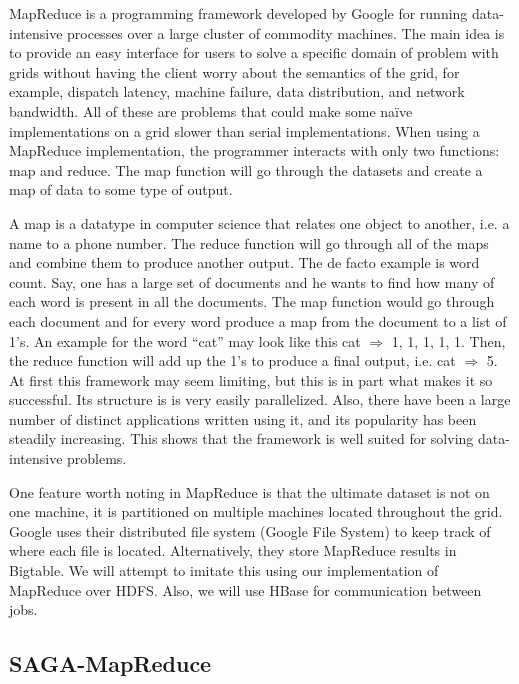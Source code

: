 \documentclass[conference,final]{IEEEtran}
\begin{document}

MapReduce is a programming framework developed by Google for running
data-intensive processes over a large cluster of commodity machines.
The main idea is to provide an easy interface for users to solve a
specific domain of problem with grids without having the client worry 
about the semantics of the grid, for example, dispatch latency, machine
failure, data distribution, and network bandwidth.  All of these are
problems that could make some naïve implementations on a grid slower
than serial implementations.  When using a MapReduce implementation,
the programmer interacts with only two functions: map and reduce.  
The map function will go through the datasets and create a map of data
to some type of output.  

A map is a datatype in computer science that relates one object to
another, i.e. a name to a phone number.  The reduce function will go
through all of the maps and combine them to produce another output.
The de facto example is word count.  Say, one has a large set of
documents and he wants to find how many of each word is present in all
the documents.  The map function would go through each document and
for every word produce a map from the document to a list of 1’s.  An
example for the word “cat” may look like this cat $\Rightarrow$ 1, 1,
1, 1, 1.  Then, the reduce function will add up the 1’s to produce a
final output, i.e. cat $\Rightarrow$ 5.  At first this framework may
seem limiting, but this is in part what makes it so successful.  Its
structure is is very easily parallelized.  Also, there have been a
large number of distinct applications written using it, and its
popularity has been steadily increasing.  This shows that the
framework is well suited for solving data-intensive problems.

One feature worth noting in MapReduce is that the ultimate dataset is
not on one machine, it is partitioned on multiple machines located
throughout the grid. Google uses their distributed file system (Google
File System) to keep track of where each file is located.
Alternatively, they store MapReduce results in Bigtable.  We will
attempt to imitate this using our implementation of MapReduce over
HDFS.  Also, we will use HBase for communication between jobs.

\subsection{SAGA-MapReduce}
\end{document}
